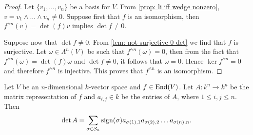 \begin{proof}
  Let \(\{v_1, \dots, v_n\}\) be a basis for \(V\). From \cref{prop: li iff
  wedge nonzero}, \(v = v_1 \wedge \dots \wedge v_n \neq 0\).  Suppose first
  that \(f\) is an isomorphism, then \(f^{\wedge n}(v) = \det(f) v\) implies
  \(\det f \neq 0\).

  Suppose now that \(\det f \neq 0\). From \cref{lem: not surjective 0 det} we
  find that \(f\) is surjective. Let \(\omega \in \Lambda^n(V)\) be such that
  \(f^{\wedge n}(\omega) = 0\), then from the fact that \(f^{\wedge n}(\omega) =
  \det(f) \omega\) and \(\det f \neq 0\), it follows that \(\omega = 0\). Hence
  \(\ker f^{\wedge n} = 0\) and therefore \(f^{\wedge n}\) is injective. This
  proves that \(f^{\wedge n}\) is an isomorphism.
\end{proof}

\begin{proposition}
  \label{prop: matrix det}
  Let \(V\) be an \(n\)-dimensional \(k\)-vector space and \(f \in \operatorname{End}(V)\).
  Let \(A: k^n \to k^n\) be the matrix representation of \(f\) and \(a_{i, j}
  \in k\) be the entries of \(A\), where \(1 \leq i, j \leq n\). Then
  \[
    \det A = \sum_{\sigma \in \mathcal S_n} \operatorname{sign}(\sigma) a_{\sigma(1), 1}
    a_{\sigma(2), 2} \dots a_{\sigma(n), n}.
  \]
\end{proposition}

